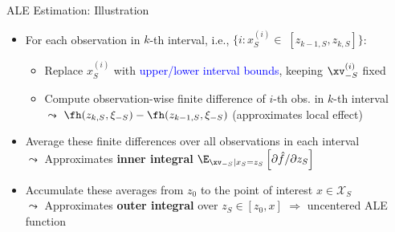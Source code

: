 \documentclass[10pt,compress,t,notes=noshow, xcolor=table]{beamer}
\begin{document}
\begin{frame}{ALE Estimation: Illustration}
\begin{itemize}
\tightlist
\item<1-> For each observation in $k$-th interval, i.e., $\{i: x_S^{(i)} \in \; [z_{k-1, S}, z_{k, S}]\}$:
  \begin{itemize}
    \item Replace $x_S^{(i)}$ with \textcolor{blue}{upper/lower interval bounds}, keeping $\xv_{-S}^{(i)}$ fixed
    \item Compute observation-wise finite difference of $i$-th obs. in $k$-th interval \\
    $\leadsto$ $\fh(z_{k, S}, \xi_{-S}) - \fh(z_{k-1, S}, \xi_{-S})$  \; (approximates local effect)  %
  \end{itemize}
\item<2-> Average these finite differences over all observations in each interval \\
$\leadsto$ Approximates \textbf{inner integral} \textcolor{red}{\( \E_{\xv_{-S} \mid x_S = z_S} \left[ \partial \hat{f}/\partial z_S \right] \)}
\item<2-> Accumulate these averages from \( z_0 \) to the point of interest \( x \in \mathcal{X}_S \) \\
$\leadsto$ Approximates \textbf{outer integral} over \( z_S \in [z_{0}, x] \) $\Rightarrow$ uncentered ALE function

\end{itemize}

\end{frame}



\end{document}
